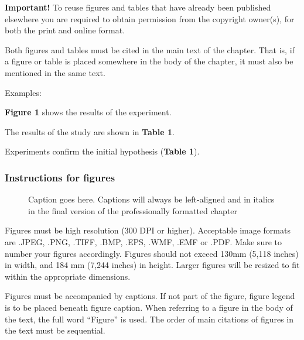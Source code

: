 \documentclass[numbers,sort&compress]{IntechOpen-Book}%
\begin{document}
\textbf{Important!} To reuse figures and tables that have already been published elsewhere you are required to obtain permission from the copyright owner(s), for both the print and online format.

Both figures and tables must be cited in the main text of the chapter. That is, if a figure or table is placed somewhere in the body of the chapter, it must also be mentioned in the same text.

Examples:

\textbf{Figure 1} shows the results of the experiment.

The results of the study are shown in \textbf{Table 1}.

Experiments confirm the initial hypothesis (\textbf{Table 1}).

\subsubsection{Instructions for figures}

\begin{figure}[!b]\centering
	{\caption{Caption goes here. Captions will always be left-aligned and in italics in the final version of the professionally formatted chapter\label{ch02:fig01}}}
\end{figure}

Figures must be high resolution (300 DPI or higher). Acceptable image formats are .JPEG, .PNG, .TIFF, .BMP, .EPS, .WMF, .EMF or .PDF. Make sure to number your figures accordingly. Figures should not exceed 130mm (5,118 inches) in width, and 184 mm (7,244 inches) in height. Larger figures will be resized to fit within the appropriate dimensions.

Figures must be accompanied by captions. If not part of the figure, figure legend is to be placed beneath figure caption. When referring to a figure in the body of the text, the full word “Figure” is used. The order of main citations of figures in the text must be sequential.
\end{document}
